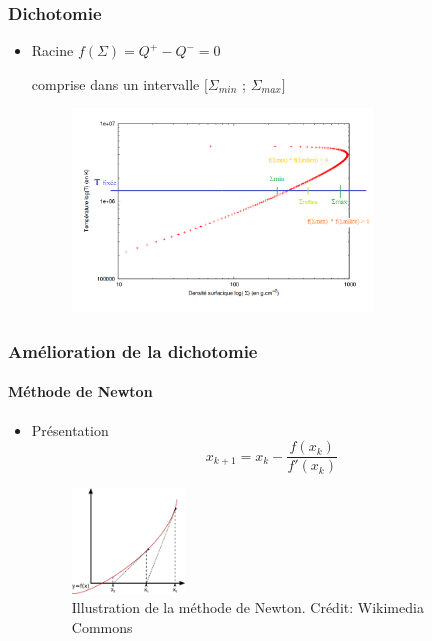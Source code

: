 
\begin{frame}
\frametitle{Dichotomie}

   \begin{itemize}
      \item Racine $f(\Sigma) = Q^+ - Q^- = 0$ 
      
      comprise dans un intervalle $[\Sigma_{min}$ ; $\Sigma_{max}]$
      \\
      \begin{figure}[htb!]
         \includegraphics[width=8cm]{figures/dicho_2.png}
      \end{figure}
   \end{itemize}
\end{frame}



\begin{frame}
\frametitle{Amélioration de la dichotomie}
\framesubtitle{Méthode de Newton}

   \begin{itemize}
      \item Présentation
      \\
      \begin{equation}
         x_{k+1} = x_k - \frac{f(x_k)}{f'(x_k)}
      \end{equation}
      \begin{figure}
      \begin{center}
      	\includegraphics[width=3cm]{figures/Newton_method.png}
       	\caption{Illustration de la méthode de Newton. 
        		  Crédit: Wikimedia Commons}
      \end{center}
      \end{figure}
   \end{itemize}
\end{frame}

